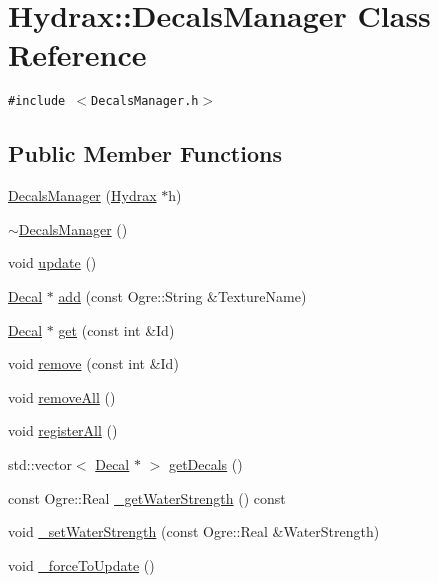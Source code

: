 \hypertarget{class_hydrax_1_1_decals_manager}{
\section{Hydrax::DecalsManager Class Reference}
\label{class_hydrax_1_1_decals_manager}
}
{\tt \#include $<$DecalsManager.h$>$}

\subsection*{Public Member Functions}
\begin{CompactItemize}
\item 
\hyperlink{class_hydrax_1_1_decals_manager_41573a26944436e790cc4f9914caf065}{DecalsManager} (\hyperlink{class_hydrax_1_1_hydrax}{Hydrax} $\ast$h)
\item 
\hyperlink{class_hydrax_1_1_decals_manager_d54dbfb7a088d551c83abd3e49853aea}{$\sim$DecalsManager} ()
\item 
void \hyperlink{class_hydrax_1_1_decals_manager_4006596e38bbdaa941d5d963104a8016}{update} ()
\item 
\hyperlink{class_hydrax_1_1_decal}{Decal} $\ast$ \hyperlink{class_hydrax_1_1_decals_manager_63cc52fdd0109f34e1c40b9cfb33f9ab}{add} (const Ogre::String \&TextureName)
\item 
\hyperlink{class_hydrax_1_1_decal}{Decal} $\ast$ \hyperlink{class_hydrax_1_1_decals_manager_4517322445c0c202cf252e64c3dc348a}{get} (const int \&Id)
\item 
void \hyperlink{class_hydrax_1_1_decals_manager_0fe39817d916ec61f18233fbf4525cfa}{remove} (const int \&Id)
\item 
void \hyperlink{class_hydrax_1_1_decals_manager_9b32ab656bcf592929b2c10d25e2416b}{removeAll} ()
\item 
void \hyperlink{class_hydrax_1_1_decals_manager_a96b53445a99ef4eb3741532e4a05935}{registerAll} ()
\item 
std::vector$<$ \hyperlink{class_hydrax_1_1_decal}{Decal} $\ast$ $>$ \hyperlink{class_hydrax_1_1_decals_manager_4877d20f120ba74a270843de234420f3}{getDecals} ()
\item 
const Ogre::Real \hyperlink{class_hydrax_1_1_decals_manager_7e225b232081b0cef39f7251c1e5d2ad}{\_\-getWaterStrength} () const 
\item 
void \hyperlink{class_hydrax_1_1_decals_manager_64d3964e3ceb550dc5735307cad922bc}{\_\-setWaterStrength} (const Ogre::Real \&WaterStrength)
\item 
void \hyperlink{class_hydrax_1_1_decals_manager_b3ffe8faa2c0f00ef738d7e7ce493aed}{\_\-forceToUpdate} ()
\end{CompactItemize}



